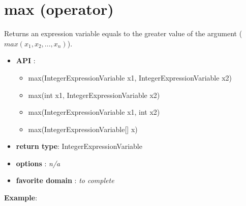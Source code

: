 
\section{max (operator)}\label{max:maxoperator}\hypertarget{max:maxoperator}{}
Returns an expression variable equals to the greater value of the argument (\(max(x_1, x_2, ..., x_n)\)).

\begin{itemize}
	\item \textbf{API} :
	\begin{itemize}
		\item max(IntegerExpressionVariable x1, IntegerExpressionVariable x2)
		\item max(int x1, IntegerExpressionVariable x2)
		\item max(IntegerExpressionVariable x1, int x2)
		\item max(IntegerExpressionVariable[] x)
	\end{itemize}
	\item \textbf{return type}: IntegerExpressionVariable
	\item \textbf{options} : \emph{n/a}
	\item \textbf{favorite domain} : \emph{to complete}
\end{itemize}

\textbf{Example}:


